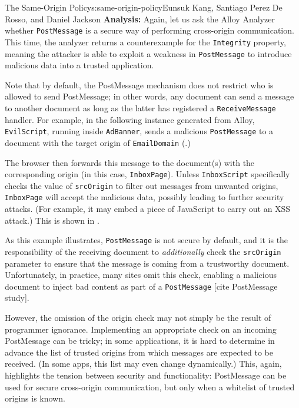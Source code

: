 \begin{aosachapter}{The Same-Origin Policy}{s:same-origin-policy}{Eunsuk Kang, Santiago Perez De Rosso, and Daniel Jackson}
\textbf{Analysis:} Again, let us ask the Alloy Analyzer whether
\texttt{PostMessage} is a secure way of performing cross-origin
communication. This time, the analyzer returns a counterexample for the
\texttt{Integrity} property, meaning the attacker is able to exploit a
weakness in \texttt{PostMessage} to introduce malicious data into a
trusted application.

Note that by default, the PostMessage mechanism does not restrict who is
allowed to send PostMessage; in other words, any document can send a
message to another document as long as the latter has registered a
\texttt{ReceiveMessage} handler. For example, in the following instance
generated from Alloy, \texttt{EvilScript}, running inside
\texttt{AdBanner}, sends a malicious \texttt{PostMessage} to a document
with the target origin of \texttt{EmailDomain}
(.)


The browser then forwards this message to the document(s) with the
corresponding origin (in this case, \texttt{InboxPage}). Unless
\texttt{InboxScript} specifically checks the value of \texttt{srcOrigin}
to filter out messages from unwanted origins, \texttt{InboxPage} will
accept the malicious data, possibly leading to further security attacks.
(For example, it may embed a piece of JavaScript to carry out an XSS
attack.) This is shown in
.


As this example illustrates, \texttt{PostMessage} is not secure by
default, and it is the responsibility of the receiving document to
\emph{additionally} check the \texttt{srcOrigin} parameter to ensure
that the message is coming from a trustworthy document. Unfortunately,
in practice, many sites omit this check, enabling a malicious document
to inject bad content as part of a \texttt{PostMessage} {[}cite
PostMessage study{]}.

However, the omission of the origin check may not simply be the result
of programmer ignorance. Implementing an appropriate check on an
incoming PostMessage can be tricky; in some applications, it is hard to
determine in advance the list of trusted origins from which messages are
expected to be received. (In some apps, this list may even change
dynamically.) This, again, highlights the tension between security and
functionality: PostMessage can be used for secure cross-origin
communication, but only when a whitelist of trusted origins is known.


\end{aosachapter}
